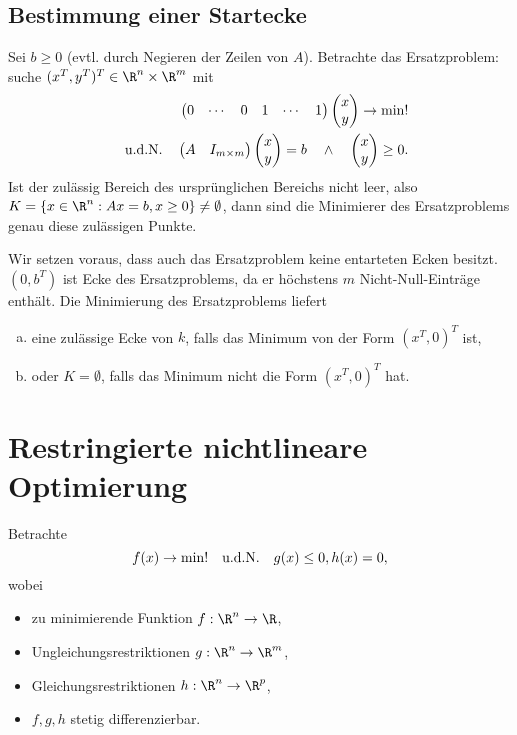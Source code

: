 \subsection{Bestimmung einer Startecke}

Sei \oBdA $b \ge 0$ (evtl. durch Negieren der Zeilen von $A$).
Betrachte das Ersatzproblem:
suche $(x^T,y^T)^T \in \R^n \times \R^m$ mit
\begin{align*}
	\begin{pmatrix}
		0 & \cdots & 0 & 1 & \cdots & 1
	\end{pmatrix}
	\begin{pmatrix}
		x \\ y
	\end{pmatrix}
	\to \min! \\
	\quad\text{u.d.N.}\quad
	\begin{pmatrix}
		A & I_{m\times m}
	\end{pmatrix}
	\begin{pmatrix}
		x \\ y
	\end{pmatrix}
	= b
	\quad \land \quad
	\begin{pmatrix}
		x \\ y
	\end{pmatrix}
	\ge 0.
\end{align*}
Ist der zulässig Bereich des ursprünglichen Bereichs nicht leer, also $K = \{x \in \R^n : Ax = b, x \ge 0 \} \neq \emptyset$, dann sind die Minimierer des Ersatzproblems genau diese zulässigen Punkte.

Wir setzen voraus, dass auch das Ersatzproblem keine entarteten Ecken besitzt.
$(0, b^T)$ ist Ecke des Ersatzproblems, da er höchstens $m$ Nicht-Null-Einträge enthält.
Die Minimierung des Ersatzproblems liefert
\begin{enumerate}[(a)]
	\item
		eine zulässige Ecke von $k$, falls das Minimum von der Form $(x^T, 0)^T$ ist,
	\item
		oder $K = \emptyset$, falls das Minimum nicht die Form $(x^T, 0)^T$ hat.
\end{enumerate}


\section{Restringierte nichtlineare Optimierung}


Betrachte
\[
	f(x) \to \min! \quad\text{u.d.N.}\quad g(x) \le 0, h(x) = 0,
\]
wobei
\begin{itemize}
	\item
		zu minimierende Funktion $f: \R^n \to \R$,
	\item
		Ungleichungsrestriktionen $g: \R^n \to \R^m$,
	\item
		Gleichungsrestriktionen $h: \R^n \to \R^p$,
	\item
		$f,g,h$ stetig differenzierbar.
\end{itemize}

